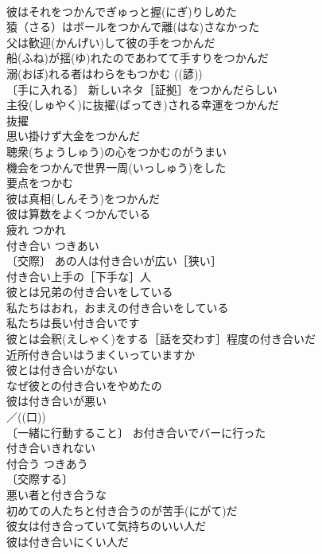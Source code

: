 \documentclass[8pt]{extreport}
\begin{document}
\begin{CJK}{UTF8}{min}
\\	彼はそれをつかんでぎゅっと握(にぎ)りしめた 
\\	猿（さる）はボールをつかんで離(はな)さなかった 
\\	父は歓迎(かんげい)して彼の手をつかんだ 
\\	船(ふね)が揺(ゆ)れたのであわてて手すりをつかんだ 
\\	溺(おぼ)れる者はわらをもつかむ ((諺)) 
\\	〔手に入れる〕 新しいネタ［証拠］をつかんだらしい 
\\	主役(しゅやく)に抜擢(ばってき)される幸運をつかんだ 
\\	抜擢　
\\	思い掛けず大金をつかんだ 
\\	聴衆(ちょうしゅう)の心をつかむのがうまい 
\\	機会をつかんで世界一周(いっしゅう)をした 
\\	要点をつかむ 
\\	彼は真相(しんそう)をつかんだ 
\\	彼は算数をよくつかんでいる 
\\	疲れ	つかれ	
\\	付き合い	つきあい	
\\	〔交際〕 あの人は付き合いが広い［狭い］ 
\\	付き合い上手の［下手な］人 
\\	彼とは兄弟の付き合いをしている 
\\	私たちはおれ，おまえの付き合いをしている 
\\	私たちは長い付き合いです 
\\	彼とは会釈(えしゃく)をする［話を交わす］程度の付き合いだ 
\\	近所付き合いはうまくいっていますか 
\\	彼とは付き合いがない 
\\	なぜ彼との付き合いをやめたの 
\\	彼は付き合いが悪い 
\\	／((口)) 
\\	〔一緒に行動すること〕 お付き合いでバーに行った 
\\	付き合いきれない 
\\	付合う	つきあう	
\\	〔交際する〕
\\	悪い者と付き合うな 
\\	初めての人たちと付き合うのが苦手(にがて)だ 
\\	彼女は付き合っていて気持ちのいい人だ 
\\	彼は付き合いにくい人だ 

\end{CJK}
\end{document}
